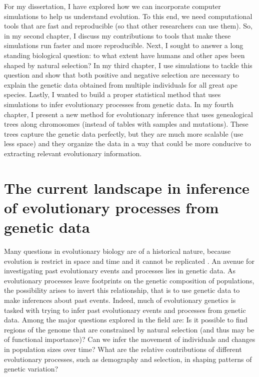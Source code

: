 For my dissertation, I have explored how we can incorporate computer simulations to help us understand evolution.
To this end, we need computational tools that are fast and reproducible (so that other researchers can use them).
So, in my second chapter, I discuss my contributions to tools that make these simulations run faster and more reproducible.
Next, I sought to answer a long standing biological question: to what extent have humans and other apes been shaped by natural selection?
In my third chapter, I use simulations to tackle this question and show that both positive and negative selection are necessary to explain the genetic data obtained from multiple individuals for all great ape species.
Lastly, I wanted to build a proper statistical method that uses simulations to infer evolutionary processes from genetic data.
In my fourth chapter, I present a new method for evolutionary inference that uses genealogical trees along chromosomes
(instead of tables with samples and mutations).
These trees capture the genetic data perfectly, but they are much more scalable (use less space) and
they organize the data in a way that could be more conducive to extracting relevant evolutionary information.

\section{The current landscape in inference of evolutionary processes from genetic data}

Many questions in evolutionary biology are of a historical nature,
because evolution is restrict in space and time and it cannot be replicated \citep{losos_evolutionary_2009, cleland_methodological_2002}.
An avenue for investigating past evolutionary events and processes lies in genetic data.
As evolutionary processes leave footprints on the genetic composition of populations,
the possibility arises to invert this relationship,
that is to use genetic data to make inferences about past events.
Indeed, much of evolutionary genetics is tasked with trying to infer past evolutionary events and processes from genetic data.
Among the major questions explored in the field are: 
Is it possible to find regions of the genome that are constrained by natural selection (and thus may be of functional importance)?
Can we infer the movement of individuals and changes in population sizes over time?
What are the relative contributions of different evolutionary processes, such as demography and selection, in shaping patterns of genetic variation? 

